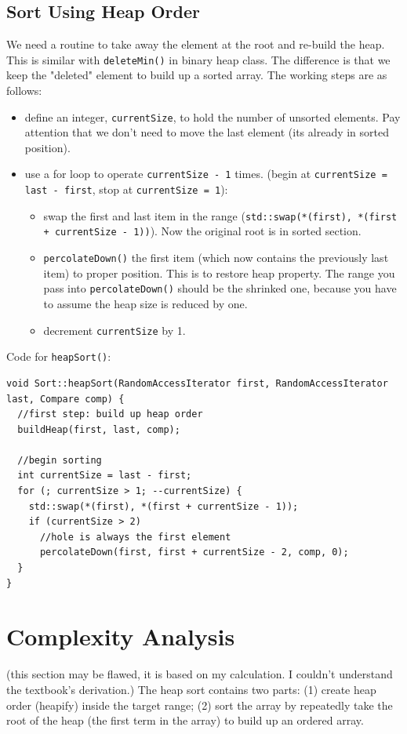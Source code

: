 \documentclass[12pt]{book}
\begin{document}
\subsection{Sort Using Heap Order}
\label{sec:org91341ef}

We need a routine to take away the element at the root and re-build the heap. This is similar with \texttt{deleteMin()} in binary heap class. The difference is that we keep the "deleted" element to build up a sorted array. The working steps are as follows:
\begin{itemize}
\item define an integer, \texttt{currentSize}, to hold the number of unsorted elements. Pay attention that we don't need to move the last element (its already in sorted position).
\item use a for loop to operate \texttt{currentSize - 1} times. (begin at  \texttt{currentSize = last - first}, stop at \texttt{currentSize = 1}):
\begin{itemize}
\item swap the first and last item in the range (\texttt{std::swap(*(first), *(first + currentSize - 1))}). Now the original root is in sorted section.
\item \texttt{percolateDown()} the first item (which now contains the previously last item) to proper position. This is to restore heap property. The range you pass into \texttt{percolateDown()} should be the shrinked one, because you have to assume the heap size is reduced by one.
\item decrement \texttt{currentSize} by 1.
\end{itemize}
\end{itemize}


Code for \texttt{heapSort()}:
\begin{verbatim}
void Sort::heapSort(RandomAccessIterator first, RandomAccessIterator last, Compare comp) {
  //first step: build up heap order 
  buildHeap(first, last, comp);

  //begin sorting 
  int currentSize = last - first;
  for (; currentSize > 1; --currentSize) {
    std::swap(*(first), *(first + currentSize - 1));
    if (currentSize > 2)
      //hole is always the first element 
      percolateDown(first, first + currentSize - 2, comp, 0);
  }
}

\end{verbatim}
\section{Complexity Analysis}
\label{sec:orga8297d8}
(this section may be flawed, it is based on my calculation. I couldn't understand the textbook's derivation.)
The heap sort contains two parts: (1) create heap order (heapify) inside the target range; (2) sort the array by repeatedly take the root of the heap (the first term in the array) to build up an ordered array.
\end{document}
